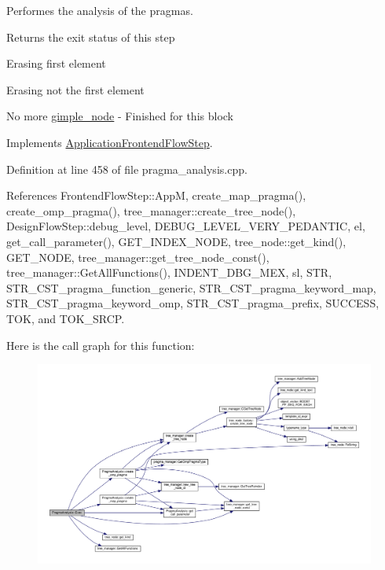 Performes the analysis of the pragmas. 

\begin{DoxyReturn}{Returns}
the exit status of this step 
\end{DoxyReturn}
Erasing first element

Erasing not the first element

No more \hyperlink{structgimple__node}{gimple\+\_\+node} -\/ Finished for this block 

Implements \hyperlink{classApplicationFrontendFlowStep_a2bf060a5ebc1735635dc5c7773387a25}{Application\+Frontend\+Flow\+Step}.



Definition at line 458 of file pragma\+\_\+analysis.\+cpp.



References Frontend\+Flow\+Step\+::\+AppM, create\+\_\+map\+\_\+pragma(), create\+\_\+omp\+\_\+pragma(), tree\+\_\+manager\+::create\+\_\+tree\+\_\+node(), Design\+Flow\+Step\+::debug\+\_\+level, D\+E\+B\+U\+G\+\_\+\+L\+E\+V\+E\+L\+\_\+\+V\+E\+R\+Y\+\_\+\+P\+E\+D\+A\+N\+T\+IC, el, get\+\_\+call\+\_\+parameter(), G\+E\+T\+\_\+\+I\+N\+D\+E\+X\+\_\+\+N\+O\+DE, tree\+\_\+node\+::get\+\_\+kind(), G\+E\+T\+\_\+\+N\+O\+DE, tree\+\_\+manager\+::get\+\_\+tree\+\_\+node\+\_\+const(), tree\+\_\+manager\+::\+Get\+All\+Functions(), I\+N\+D\+E\+N\+T\+\_\+\+D\+B\+G\+\_\+\+M\+EX, sl, S\+TR, S\+T\+R\+\_\+\+C\+S\+T\+\_\+pragma\+\_\+function\+\_\+generic, S\+T\+R\+\_\+\+C\+S\+T\+\_\+pragma\+\_\+keyword\+\_\+map, S\+T\+R\+\_\+\+C\+S\+T\+\_\+pragma\+\_\+keyword\+\_\+omp, S\+T\+R\+\_\+\+C\+S\+T\+\_\+pragma\+\_\+prefix, S\+U\+C\+C\+E\+SS, T\+OK, and T\+O\+K\+\_\+\+S\+R\+CP.

Here is the call graph for this function\+:
\nopagebreak
\begin{figure}[H]
\begin{center}
\leavevmode
\includegraphics[width=350pt]{d1/d63/classPragmaAnalysis_a972bd7b68f27335d6fbf6e1d327c2663_cgraph}
\end{center}
\end{figure}
\mbox{\label{classPragmaAnalysis_a568d30b208cf8dc645246ac355b390bb}} 
